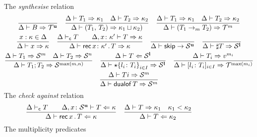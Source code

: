 \begin{figure}[h!]
  The \emph{synthesise} relation \hfill{}
  \begin{gather*}
    \frac{}{\algkindout{\tcBase}{\kindt^\Un}}
    \quad 
    \frac{
      \algkindout{T_1}{\kind_1}
      \quad
      \algkindout{T_2}{\kind_2}
    }{
      \algkindout{\tPair{T_1}{T_2}}{\kind_1\lub \kind_2)}
    }
    \quad
    \frac{
      \algkindout{T_1}{\kind_1}
      \quad
      \algkindout{T_2}{\kind_2}
    }{
      \algkindout{(\tFun{T_1}{T_2})}{\kindt^m}
    }
    \\
    \frac{x : \kind \in \kindEnv}{\algkindout x \kind}
   \quad
  \frac{
    \isContractive T
    \qquad
    \algkindout[\kindEnv, x\colon \kind'] T \kind
  }{
    \algkindout{\tRec {x\colon \kind'} T}{\kind}
  }
  \quad
  \frac{}{\kindEnv \Alg \tSkip \rightarrow \kinds^\Un}
  \quad 
  \frac{}{\algkindout{\tMsg T}{\kinds^\Lin}}
  \\
  \frac{
    \algkindout{T_1}{\kinds^m}
    \quad
    \algkindout{T_2}{\kinds^n}
  }{
    \algkindout{\tSemi{T_1}{T_2}}{\kinds^{\max(m,n)}}
  }
  \quad
  \frac{
    \algkindin{T}{\kinds^\Lin}
  }{
    \algkindout{\tChoice{\{l_i\colon T_i\}}_{i\in I}}{\kinds^\Lin}
  }
  \quad
  \frac{
    \algkindout{T_i}{v^{m_i}}
  }{
    \algkindout{\tData{l_i\colon T_i}_{i\in I}}{\kindt^{\max(m_i)}}
  }  
  \\
  \frac{
    \algkindout{Ti}{\kinds^m}
  }{
    \algkindout{\tDualof T}{\kinds^m}
  }
  \end{gather*}
  The \emph{check against} relation\hfill{}
  \begin{equation*}
    \frac{
      \isContractive T
      \qquad
      \algkindin[\kindEnv, x\colon \kinds^\Un] T \kind
    }{
      \algkindin{\tRec xT}{\kind}
    }
    \quad
    \frac{
      \algkindout{T}{\kind_1}
      \quad
      \isSubkind{\kind_1}{\kind_2}
    }{
      \algkindin T {\kind_2}
    }
  \end{equation*}
  The multiplicity predicates \hfill{}\quad{}

\end{figure}
